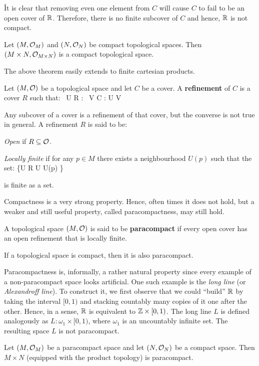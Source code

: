 \v

It is clear that removing even one element from $C$ will cause $C$ to fail to be an open cover of $\mathbb{R}$. Therefore,
there is no finite subcover of $C$ and hence, $\mathbb{R}$ is not compact.
\ee

\bt[]
Let $(M,\mathcal{O}_M)$ and $(N,\mathcal{O}_N)$ be compact topological spaces. Then $ (M\times N,\mathcal{O}_{M\times N})$ is a compact
topological space.
\et

The above theorem easily extends to finite cartesian products.

\bd [Refinement]
Let $(M,\mathcal{O})$ be a topological space and let $C$ be a cover. A \textbf{refinement} of $C$ is a cover $R$ such that:
\bse
\forall \, U \in R : \exists \, V \in C : U \se V
\ese
\ed

Any subcover of a cover is a refinement of that cover, but the converse is not true in general. A refinement $R$ is
said to be:
\bit
\item \emph{Open} if $R\subseteq \mathcal{O}$.
\item \emph{Locally finite} if for any $p\in M$ there exists a neighbourhood $U(p)$ such that the set:
\bse
\{U \in R \mid U \cap U(p) \neq \vn\}
\ese

is finite as a set.
\eit

Compactness is a very strong property. Hence, often times it does not hold, but a weaker and still useful property,
called paracompactness, may still hold.

A topological space $(M,\mathcal{O})$ is said to be \textbf{paracompact} if every open cover has an open refinement that is
locally finite.
\ed

\bt[]
If a topological space is compact, then it is also paracompact.
\et

Paracompactness is, informally, a rather natural property since every example of a non-paracompact space looks
artificial. One such example is the \emph{long line} (or \emph{Alexandroff line}). To construct it, we first observe
that we could ``build'' $\mathbb{R}$ by taking the interval $[0,1)$ and stacking countably many copies of it one after the
other. Hence, in a sense, $\mathbb{R}$ is equivalent to $\mathbb{Z} \times [0,1)$. The long line $L$ is defined analogously as
$L:\omega_1\times [0,1)$, where $\omega_1$ is an uncountably infinite set. The resulting space $L$ is not paracompact.

\bt[]
Let $(M,\mathcal{O}_M)$ be a paracompact space and let $(N,\mathcal{O}_N)$ be a compact space. Then $M\times N$ (equipped with the
product topology) is paracompact.
\et

